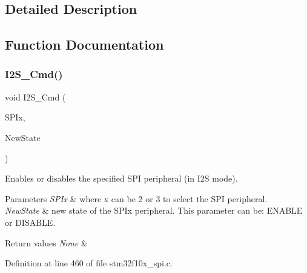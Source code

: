 \subsection{Detailed Description}


\subsection{Function Documentation}
\mbox{\label{group___s_p_i___private___functions_gafe061c71bbc5b4224f3f2884dc53739e}} 
\subsubsection{\texorpdfstring{I2\+S\+\_\+\+Cmd()}{I2S\_Cmd()}}
{\footnotesize\ttfamily void I2\+S\+\_\+\+Cmd (\begin{DoxyParamCaption}\item[{\hyperlink{struct_s_p_i___type_def}{S\+P\+I\+\_\+\+Type\+Def} $\ast$}]{S\+P\+Ix,  }\item[{\hyperlink{group___exported__types_gac9a7e9a35d2513ec15c3b537aaa4fba1}{Functional\+State}}]{New\+State }\end{DoxyParamCaption})}



Enables or disables the specified S\+PI peripheral (in I2S mode). 


\begin{DoxyParams}{Parameters}
{\em S\+P\+Ix} & where x can be 2 or 3 to select the S\+PI peripheral. \\
\hline
{\em New\+State} & new state of the S\+P\+Ix peripheral. This parameter can be\+: E\+N\+A\+B\+LE or D\+I\+S\+A\+B\+LE. \\
\hline
\end{DoxyParams}

\begin{DoxyRetVals}{Return values}
{\em None} & \\
\hline
\end{DoxyRetVals}


Definition at line 460 of file stm32f10x\+\_\+spi.\+c.

\mbox{\label{group___s_p_i___private___functions_ga53661884ae4a9640df7cbc59187782f7}} 
